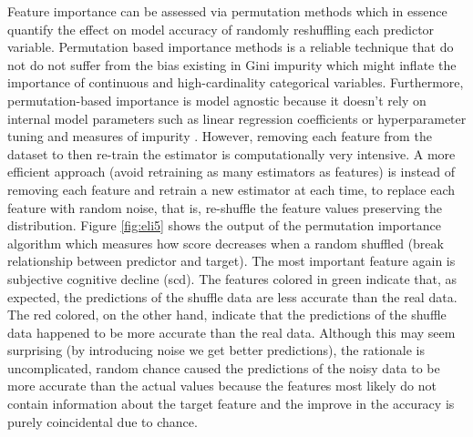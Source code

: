 \documentclass[preprint,12pt]{elsarticle}
\begin{document}
Feature importance can be assessed via permutation methods which in essence quantify the effect on model accuracy of randomly reshuffling each predictor variable. Permutation based importance methods is a reliable technique that do not do not suffer from the bias existing in Gini impurity which might inflate the importance of continuous and high-cardinality categorical variables.
Furthermore, permutation-based importance is model agnostic because it doesn't rely on internal model parameters such as linear regression coefficients or hyperparameter tuning and measures of impurity \cite{breiman2001statistical}. 
However, removing each feature from the dataset to then re-train the estimator is computationally very intensive. 
A more efficient approach (avoid retraining as many estimators as features) is instead of removing each feature and retrain a new estimator at each time, to replace each feature with random noise, that is, re-shuffle the feature values preserving the distribution.
Figure \ref{fig:eli5} shows the output of the permutation importance algorithm which measures how score decreases when a random shuffled (break relationship between predictor and target). The most important feature again is subjective cognitive decline (scd). 
The features colored in green indicate that, as expected, the predictions of the shuffle data are less accurate than the real data. The red colored, on the other hand, indicate that the predictions of the shuffle data happened to be more accurate than the real data. Although this may seem surprising (by introducing noise we get better predictions), the rationale is uncomplicated, random chance caused the predictions of the noisy data to be more accurate than the actual values because the features most likely do not contain information about the target feature and the improve in the accuracy is purely coincidental due to chance.
\end{document}
